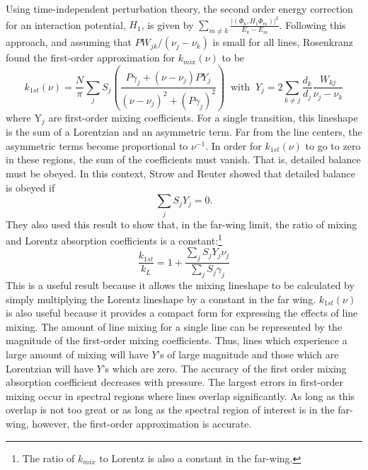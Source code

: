 \documentclass[11pt]{article}
\begin{document}
Using time-independent perturbation theory, the second order energy
correction for an interaction potential, $H_{1}$, is given by
$\sum_{m\neq k}\frac{|(\Phi_{k},H_{1}\Phi_{m})|^{2}}{E_{k}-E_{m}}$.
Following this approach, and assuming that $PW_{jk}/(\nu_{j}-\nu_{k})$ is
small for all lines, Rosenkranz found the first-order approximation for
$k_{mix}(\nu)$ to be \cite{ros:75,ros:88}
\begin{equation}
k_{1st}(\nu)=\frac{N}{\pi}\sum_{j} S_{j}
\left(\frac{P \gamma_{j}+ 
(\nu-\nu_{j})PY_{j}}{(\nu-\nu_{j})^{2}+(P\gamma_{j})^{2}}\right)
\; \; \mbox{with} \; \; 
Y_j=2\sum_{k\neq j}\frac{d_k}{d_j}\frac{W_{kj}}{\nu_j-\nu_k}
\label{eqn:kmix}
\end{equation}
where 
$\mbox{Y}_j$ are first-order mixing coefficients.  For a single transition, 
this lineshape is the sum of a Lorentzian and an asymmetric term.  Far from
the line centers, the asymmetric terms become proportional to $\nu^{-1}$.  
In order for $k_{1st}(\nu)$ to go to zero in these regions, the sum of the
coefficients must vanish.  That is, detailed balance must be obeyed.  In 
this context, Strow and Reuter\cite{str:88*1} showed that detailed balance 
is obeyed if
\begin{equation}
 \sum_{j} S_{j} Y_{j}=0.
\end{equation}
They also used this result to show that, in the far-wing limit, the 
ratio of mixing and Lorentz absorption coefficients is a
constant\cite{str:88*1}:\footnote{The ratio of $k_{mix}$ to Lorentz is also
a constant in the far-wing.}
\begin{equation}
 \frac{k_{1st}}{k_{L}}= 1 + \frac{\sum_{j}S_{j}Y_{j}\nu_{j}}
{\sum_{j}S_{j}\gamma_{j}}
\end{equation}
This is a useful result because it allows the mixing lineshape to be
calculated by simply multiplying the Lorentz lineshape by a constant in
the far wing.
$k_{1st}(\nu)$ is also useful because it provides a compact form for
expressing the effects of line mixing.  The amount of line mixing 
for a single line can be represented by the magnitude of 
the first-order mixing coefficients.
Thus, lines which experience a large amount of mixing will have $Y$'s of
large magnitude and those which are Lorentzian will have $Y$'s which are
zero. The accuracy of the first order mixing absorption coefficient 
decreases with pressure.  The largest errors in first-order mixing occur 
in spectral
regions where lines overlap significantly.  As long as this overlap is not
too great or as long as the spectral region of interest is in the far-wing,
however, the first-order approximation is accurate.
\end{document}

